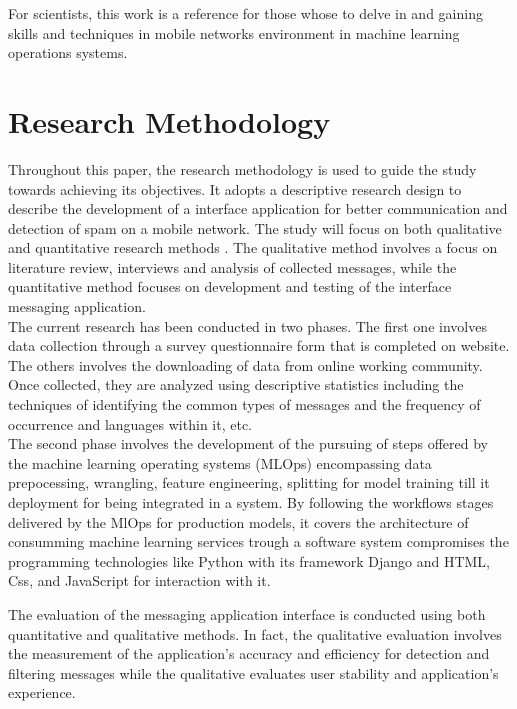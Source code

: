 \documentclass[12pt,a4paper, oneside]{book}
\begin{document}
	For scientists, this work is a reference for those whose to delve in and gaining skills and techniques in mobile networks environment in machine learning operations systems.
	
	\section{Research Methodology}
	Throughout this paper, the research methodology is used to guide the study towards achieving its objectives. It adopts a descriptive research design to describe the development of a interface application for better communication and detection of spam on a mobile network. The study will focus on both qualitative and quantitative research methods \cite{creswell2014research}. The qualitative method  involves a focus on literature review, interviews and analysis of collected messages, while the quantitative method focuses on development and testing of the interface messaging application.\\
		
	The current research has been conducted in two phases. The first one involves data collection through a survey questionnaire form that is completed on website. The others involves the downloading of data from online working community. Once collected, they are analyzed using descriptive statistics \cite{bluman2017elementary} including the techniques of identifying the common types of messages and the frequency of occurrence and languages within it, etc.  \\
	
	The second phase involves the development of the pursuing of steps offered by the machine learning operating systems (MLOps) encompassing data prepocessing, wrangling, feature engineering, splitting for model training till it deployment for being integrated in a system. 
	By following the workflows stages delivered by the MlOps for production models, it covers the architecture of consumming machine learning services trough a software system compromises the programming technologies like Python with its framework Django and HTML, Css, and JavaScript for interaction with it.
	
	The evaluation of the messaging application interface is conducted using both quantitative and qualitative methods. In fact, the qualitative evaluation involves the measurement of the application's accuracy and efficiency for detection and filtering messages while the qualitative evaluates user stability and application's experience.
	
\end{document}
